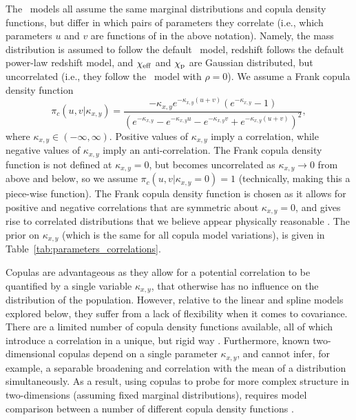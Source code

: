 The \copulacorrelation~models all assume the same marginal distributions and copula density functions, but differ in which pairs of parameters they correlate (i.e., which parameters $u$ and $v$ are functions of in the above notation).
Namely, the mass distribution is assumed to follow the default \BrokenPLTwoPeaks~model, redshift follows the default power-law redshift model, and $\chi_{\rm eff}$ and $\chi_\mathrm{p}$ are Gaussian distributed, but uncorrelated (i.e., they follow the \effectiveSpinModel~model with $\rho=0$).
We assume a Frank copula density function
\begin{equation}
    \pi_c\left(u, v | \kappa_{x,y}\right) = 
    \frac{-\kappa_{x,y} e^{-\kappa_{x,y} (u+v)} (e^{-\kappa_{x,y}} - 1)}{\left( e^{-\kappa_{x,y}} - e^{-\kappa_{x,y} u} - e^{-\kappa_{x,y} v} + e^{-\kappa_{x,y}(u+v)} \right)^2},
\end{equation}
where $\kappa_{x,y} \in (-\infty, \infty)$.
Positive values of $\kappa_{x,y}$ imply a correlation, while negative values of $\kappa_{x,y}$ imply an anti-correlation.
The Frank copula density function is not defined at $\kappa_{x,y} = 0$, but becomes uncorrelated as $\kappa_{x,y} \rightarrow 0$ from above and below, so we assume $\pi_c\left(u, v | \kappa_{x,y}=0\right) = 1$ (technically, making this a piece-wise function).
The Frank copula density function is chosen as it allows for positive and negative correlations that are symmetric about $\kappa_{x,y}=0$, and gives rise to correlated distributions that we believe appear physically reasonable \citep[][]{Adamcewicz:2022hce, Adamcewicz:2023mov}.
The prior on $\kappa_{x,y}$ (which is the same for all copula model variations), is given in Table~\ref{tab:parameters_correlations}.

Copulas are advantageous as they allow for a potential correlation to be quantified by a single variable $\kappa_{x,y}$, that otherwise has no influence on the distribution of the population.
However, relative to the linear and spline models explored below, they suffer from a lack of flexibility when it comes to covariance.
There are a limited number of copula density functions available, all of which introduce a correlation in a unique, but rigid way \citep[e.g,][]{Adamcewicz:2022hce, Adamcewicz:2023mov}.
Furthermore, known two-dimensional copulas depend on a single parameter $\kappa_{x,y}$, and cannot infer, for example, a separable broadening and correlation with the mean of a distribution simultaneously.
As a result, using copulas to probe for more complex structure in two-dimensions (assuming fixed marginal distributions), requires model comparison between a number of different copula density functions \citep[e.g.,][]{Adamcewicz:2023mov}.


